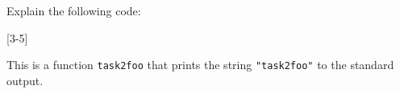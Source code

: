 Explain the following code:

[3-5]

\begin{solution}
    This is a function \lstinline{task2foo}
    that prints the string \lstinline{"task2foo"} to the standard output.
\end{solution}
